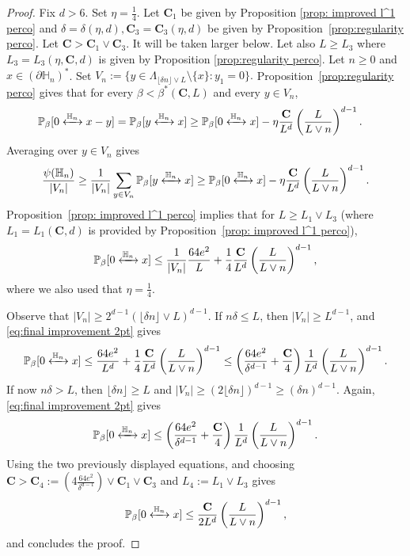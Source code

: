 \documentclass[11pt,a4paper]{article}
\numberwithin{equation}{section}
\theoremstyle{plain}
\theoremstyle{definition}
\newcommand\bfC{\mathbf{C}}
\newcommand{\connect}{\xleftrightarrow}
\begin{document}
\begin{proof}
Fix $d>6$. Set $\eta=\tfrac14$. Let $\bfC_1$ be given by Proposition \ref{prop: improved l^1 perco} and $\delta=\delta(\eta,d),\bfC_3=\bfC_3(\eta,d)$ be given by Proposition~\ref{prop:regularity perco}. Let $\bfC >\bfC_1\vee \bfC_3$. It will be taken larger below. Let also $L\geq L_3$ where $L_3=L_3(\eta,\bfC,d)$ is given by Proposition \ref{prop:regularity perco}. Let $n\geq 0$ and $x\in (\partial\mathbb H_n)^*$. Set $
V_n:=\{y\in\Lambda_{ \lfloor \delta n\rfloor\vee L }\setminus\{x\}:y_1=0\}.$
Proposition~\ref{prop:regularity perco} gives that for every $\beta<\beta^*(\bfC,L)$ and every $y\in V_n$,
\begin{align}\notag
\mathbb P_\beta[0\connect{\mathbb H_n\:}x-y]&=\mathbb P_\beta[y\connect{\mathbb H_n\:}x]
\ge \mathbb P_\beta[0\connect{\mathbb H_n\:}x]-\eta\frac{\bfC}{L^d}\left(\frac{L}{L\vee n}\right)^{d-1}\label{eq:h1}.
\end{align}
Averaging over $y\in V_n$ gives
\begin{equation}
	\frac{\psi(\mathbb H_n)}{|V_n|}\geq \frac{1}{|V_n|}\sum_{y\in V_n}\mathbb P_\beta[y\connect{\mathbb H_n\:}x]\geq \mathbb P_\beta[0\connect{\mathbb H_n\:}x]-\eta\frac{\bfC}{L^d}\left(\frac{L}{L\vee n}\right)^{d-1}.
\end{equation}
Proposition~\ref{prop: improved l^1 perco} implies that for $L\ge L_1\vee L_3$ (where $L_1=L_1(\bfC,d)$ is provided by Proposition~\ref{prop: improved l^1 perco}),
\begin{equation}\label{eq:final improvement 2pt}
	\mathbb P_\beta[0\connect{\mathbb H_n\:}x]\leq \frac{1}{|V_n|}\frac{64e^2}{L}+\frac{1}{4}\frac{\bfC}{L^d}\left(\frac{L}{L\vee n}\right)^{d-1},
\end{equation}
where we also used that $\eta=\tfrac{1}{4}$.

Observe that $|V_n|\geq 2^{d-1}(\lfloor\delta n\rfloor\vee L)^{d-1}$. If $n\delta \leq L$, then $|V_n|\geq L^{d-1}$, and \eqref{eq:final improvement 2pt} gives
\begin{equation}
	\mathbb P_\beta[0\connect{\mathbb H_n\:}x]\leq \frac{64e^2}{L^d}+\frac{1}{4}\frac{\bfC}{L^d}\left(\frac{L}{L\vee n}\right)^{d-1}\leq \left(\frac{64e^2}{\delta^{d-1}}+\frac{\bfC}{4}\right)\frac{1}{L^d}\left(\frac{L}{L\vee n}\right)^{d-1}.
\end{equation}
If now $n\delta>L$, then $\lfloor \delta n\rfloor\geq L$ and $|V_n|\geq (2\lfloor \delta n\rfloor)^{d-1}\geq (\delta n)^{d-1}$. Again, \eqref{eq:final improvement 2pt} gives
\begin{equation}
	\mathbb P_\beta[0\connect{\mathbb H_n\:}x]\leq \left(\frac{64e^2}{\delta^{d-1}}+\frac{\bfC}{4}\right)\frac{1}{L^d}\left(\frac{L}{L\vee n}\right)^{d-1}.
\end{equation}
Using the two previously displayed equations, and choosing $\bfC>\bfC_4:=(4\frac{64e^2}{\delta^{d-1}})\vee \bfC_1\vee  \bfC_3$ and $L_4:=L_1\vee L_3$ gives
\begin{equation}
	\mathbb P_\beta[0\connect{\mathbb H_n\:}x]\leq\frac{\bfC}{2L^d}\left(\frac{L}{L\vee n}\right)^{d-1},
\end{equation} 
and concludes the proof.
\end{proof}
\end{document}
